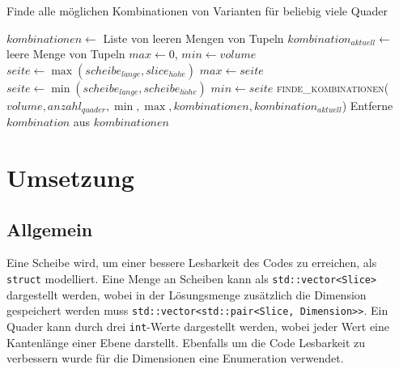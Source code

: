 \documentclass[a4paper,10pt,ngerman]{scrartcl}
\begin{document}
    \begin{algorithm}[H]
        \caption{Finde alle möglichen Kombinationen von Varianten für beliebig viele Quader}
        \label{alg:p}
        \begin{algorithmic}[1]
                \State $kombinationen \gets$ Liste von leeren Mengen von Tupeln
                \State $kombination_{aktuell} \gets$ leere Menge von Tupeln
                \State $max \gets 0$, $min \gets volume$
                    \State $seite \gets \max(scheibe_{l\ddot ange}, slice_{h\ddot ohe})$
                        \State $max \gets seite$
                    \EndIf
                    \State $seite \gets \min(scheibe_{l\ddot ange}, scheibe_{h\ddot ohe})$
                        \State $min \gets seite$
                    \EndIf
                \EndFor
                \State \textsc{finde\_kombinationen}($volume, anzahl_{quader}, \min, \max, kombinationen, kombination_{aktuell}$)
                        \State Entferne $kombination$ aus $kombinationen$
                    \EndIf
                \EndFor
                \State {}\label{alg:algorithm}
            \EndFunction
        \end{algorithmic}
    \end{algorithm}

    \newpage
    \section{Umsetzung}\label{sec:umsetzung}

    \subsection{Allgemein}\label{subsec:allgemein2}

    Eine Scheibe wird, um einer bessere Lesbarkeit des Codes zu erreichen, als \texttt{struct} modelliert.
    Eine Menge an Scheiben kann als \texttt{std::vector<Slice>} dargestellt werden, wobei in der Lösungsmenge zusätzlich
    die Dimension gespeichert werden muss \texttt{std::vector<std::pair<Slice, Dimension>>}.
    Ein Quader kann durch drei \texttt{int}-Werte dargestellt werden, wobei jeder Wert eine Kantenlänge einer Ebene darstellt.
    Ebenfalls um die Code Lesbarkeit zu verbessern wurde für die Dimensionen eine Enumeration verwendet.
\end{document}
